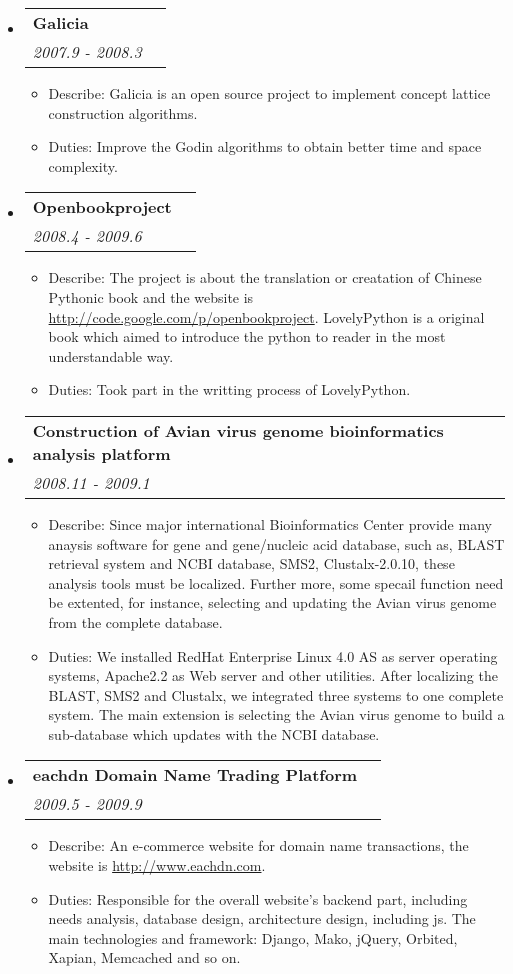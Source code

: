 \documentclass[letterpaper,11pt]{article}
\makeatletter
\newcommand{\resitem}[1]{\item #1 \vspace{-2pt}}
\newcommand{\resheading}[1]{{\large \parashade[.9]{sharpcorners}{\textbf{#1 \vphantom{p\^{E}}}}}}
\newcommand{\ressubheading}[4]{
\begin{tabular*}{6.5in}{l@{\extracolsep{\fill}}r}
        \textbf{#1} & #2 \\
        \textit{#3} & \textit{#4} \\
\end{tabular*}\vspace{-2pt}}
\makeatother
\begin{document}
\resheading{Project Experience}
\begin{itemize}

\item
    \ressubheading{Galicia}{}{2007.9 - 2008.3}{}
    \begin{itemize}
        \resitem{   Describe: Galicia is an open source project to implement concept lattice construction algorithms.}
        \resitem{   Duties: Improve the Godin algorithms to obtain better time and space complexity.}
    \end{itemize}

\item
    \ressubheading{Openbookproject}{}{2008.4 - 2009.6}{}
    \begin{itemize}
        \resitem{   Describe: The project is about the translation or creatation of Chinese Pythonic book and the website is \href{http://code.google.com/p/openbookproject/}{http://code.google.com/p/openbookproject}. LovelyPython is a original book which aimed to introduce the python to reader in the most understandable way.}
        \resitem{   Duties: Took part in the writting process of LovelyPython.}
    \end{itemize}

\item
    \ressubheading{Construction of Avian virus genome bioinformatics analysis platform}{}{2008.11 - 2009.1}{}
    \begin{itemize}
        \resitem{   Describe: Since major international Bioinformatics Center provide many anaysis software for gene and gene/nucleic acid database, such as, BLAST retrieval system and NCBI database, SMS2, Clustalx-2.0.10, these analysis tools must be localized. Further more, some specail function need be extented, for instance, selecting and updating the Avian virus genome from the complete database.}
        \resitem{   Duties: We installed RedHat Enterprise Linux 4.0 AS as server operating systems, Apache2.2 as Web server and other utilities. After localizing the BLAST, SMS2 and Clustalx, we integrated three systems to one complete system. The main extension is selecting the Avian virus genome to build a sub-database which updates with the NCBI database.}
    \end{itemize}

\item
    \ressubheading{eachdn Domain Name Trading Platform}{}{2009.5 - 2009.9}{}
    \begin{itemize}
        \resitem{   Describe: An e-commerce website for domain name transactions, the website is \href{http://www.eachdn.com/}{http://www.eachdn.com}. }
        \resitem{   Duties: Responsible for the overall website's backend part, including needs analysis, database design, architecture design, including js. The main technologies and framework: Django, Mako, jQuery, Orbited, Xapian, Memcached and so on.}
    \end{itemize}


\end{itemize}
\end{document}
